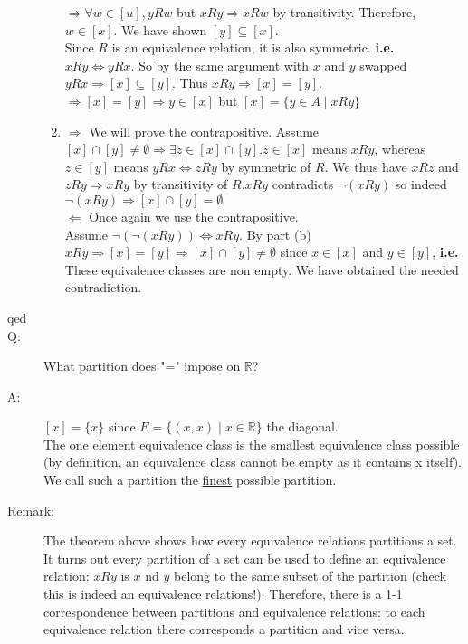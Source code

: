 \documentclass[10pt]{article}
\begin{document}
\begin{description}
\begin{enumerate}
			$\Rightarrow \forall w \in [u], yRw$ but $xRy \Rightarrow xRw$ by transitivity. Therefore, $w \in [x]$. We have shown $[y] \subseteq [x]$. \\
			Since $R$ is an equivalence relation, it is also symmetric. \textbf{i.e.} $xRy \Leftrightarrow yRx$. So by the same argument with $x$ and $y$ swapped $yRx \Rightarrow [x] \subseteq [y]$. Thus $xRy \Rightarrow [x] = [y]$. \\
			$\Rightarrow [x]=[y] \Rightarrow y \in [x]$ but $[x] = \{y \in A \mid xRy \}$
			\item $\Rightarrow$ We will prove the contrapositive. Assume $[x] \cap [y] \neq \emptyset \Rightarrow \exists z \in [x] \cap [y]. z \in [x]$ means $xRy$, whereas $z \in [y]$ means $yRx \Leftrightarrow zRy$ by symmetric of $R$. We thus have $xRz$ and $zRy \Rightarrow xRy$ by transitivity of $R. xRy$ contradicts $\lnot(xRy)$ so indeed $\lnot(xRy) \Rightarrow [x] \cap [y] = \emptyset$ \\
			$\Leftarrow$ Once again we use the contrapositive. \\
			Assume $\lnot(\lnot(xRy)) \Leftrightarrow xRy$. By part (b) $xRy \Rightarrow [x] = [y] \Rightarrow [x] \cap [y] \neq \emptyset$ since $x \in [x]$ and $y \in [y]$, \textbf{i.e.} These equivalence classes are non empty. We have obtained the needed contradiction.
		\end{enumerate}
		\item[qed]
		\item[Q:] What partition does "=" impose on $\mathbb{R}$?
		\item[A:] $[x]=\{x\}$ since $E = \{(x, x) \mid x \in \mathbb{R} \}$ the diagonal. \\
		The one element equivalence class is the smallest equivalence class possible (by definition, an equivalence class cannot be empty as it contains x itself). We call such a partition the \underline{finest} possible partition.
		\item[Remark:] The theorem above shows how every equivalence relations partitions a set. It turns out every partition of a set can be used to define an equivalence relation: $xRy$ is $x$ nd $y$ belong to the same subset of the partition (check this is indeed an equivalence relations!). Therefore, there is a 1-1 correspondence between partitions and equivalence relations: to each equivalence relation there corresponds a partition and vice versa.
	\end{description}
	
\end{document}
